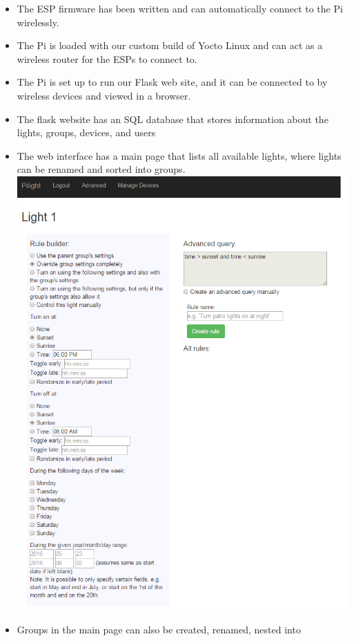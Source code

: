 \documentclass[oneside,openright]{book}
\begin{document}
\begin{itemize}
    \item The ESP firmware has been written and can automatically connect to
        the Pi wirelessly.
    \item The Pi is loaded with our custom build of Yocto Linux and can act as
        a wireless router for the ESPs to connect to.
    \item The Pi is set up to run our Flask web site, and it can be connected 
        to by wireless devices and viewed in a browser.
    \item The flask website has an SQL database that stores information about 
        the lights, groups, devices, and users
    \item The web interface has a main page that lists all available lights,
        where lights can be renamed and sorted into groups.
      \includegraphics[width=1.0\textwidth]{advanced_page.png}
    \item Groups in the main page can also be created, renamed, nested into

\end{itemize}
\end{document}
